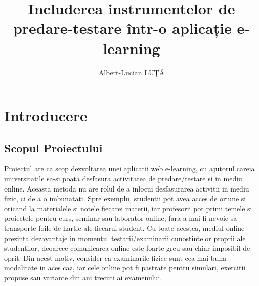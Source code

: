\documentclass[12pt, a4paper, oneside, romanian]{teza-upb}
\begin{document}
\author{Albert-Lucian LUŢĂ}

\title{Includerea instrumentelor de predare-testare într-o aplicație e-learning}



\beforepreface
\newpage
\listoffigures
{}
\afterpreface 

\chapter*{Introducere}

\section{Scopul Proiectului}

Proiectul are ca scop dezvoltarea unei aplicatii web e-learning, cu ajutorul careia universitatile sa-si poata desfasura activitatea de predare/testare si in mediu online. Aceasta metoda nu are rolul de a inlocui desfasurarea activitii in mediu fizic, ci de a o imbunatati. Spre exemplu, studentii pot avea acces de oriune si oricand la materialele si notele fiecarei materii, iar profesorii pot primi temele si proiectele pentru curs, seminar sau laborator online, fara a  mai fi nevoie sa transporte foile de hartie ale fiecarui student. Cu toate acestea, mediul online prezinta dezavantaje in momentul testarii/examinarii cunostintelor proprii ale studentilor, deoarece comunicarea online este foarte greu sau chiar imposibil de oprit. Din acest motiv, consider ca examinarile fizice sunt cea mai buna modalitate in aces caz, iar cele online pot fi pastrate pentru simulari, exercitii propuse sau variante din ani trecuti ai examenului.
\end{document}
